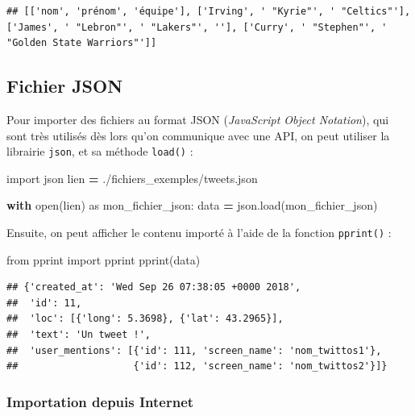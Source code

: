 \documentclass[
  12pt,
]{book}
\newenvironment{Shaded}{\begin{snugshade}}{\end{snugshade}}
\newcommand{\BuiltInTok}[1]{#1}
\newcommand{\ControlFlowTok}[1]{\textcolor[rgb]{0.13,0.29,0.53}{\textbf{#1}}}
\newcommand{\ImportTok}[1]{#1}
\newcommand{\NormalTok}[1]{#1}
\newcommand{\OperatorTok}[1]{\textcolor[rgb]{0.81,0.36,0.00}{\textbf{#1}}}
\newcommand{\StringTok}[1]{\textcolor[rgb]{0.31,0.60,0.02}{#1}}
\numberwithin{equation}{section}
\numberwithin{countremarque}{section}
\begin{document}
\begin{lstlisting}
## [['nom', 'prénom', 'équipe'], ['Irving', ' "Kyrie"', ' "Celtics"'], ['James', ' "Lebron"', ' "Lakers"', ''], ['Curry', ' "Stephen"', ' "Golden State Warriors"']]
\end{lstlisting}

\subsection{Fichier JSON}\label{fichier-json}

Pour importer des fichiers au format JSON (\emph{JavaScript Object Notation}), qui sont très utilisés dès lors qu'on communique avec une API, on peut utiliser la librairie \texttt{json}, et sa méthode \texttt{load()} :

\begin{Shaded}
\begin{Highlighting}[]
\ImportTok{import}\NormalTok{ json}
\NormalTok{lien }\OperatorTok{=} \StringTok{\textquotesingle{}./fichiers\_exemples/tweets.json\textquotesingle{}}

\ControlFlowTok{with} \BuiltInTok{open}\NormalTok{(lien) }\ImportTok{as}\NormalTok{ mon\_fichier\_json:}
\NormalTok{    data }\OperatorTok{=}\NormalTok{ json.load(mon\_fichier\_json)}
\end{Highlighting}
\end{Shaded}

Ensuite, on peut afficher le contenu importé à l'aide de la fonction \texttt{pprint()} :

\begin{Shaded}
\begin{Highlighting}[]
\ImportTok{from}\NormalTok{ pprint }\ImportTok{import}\NormalTok{ pprint}
\NormalTok{pprint(data)}
\end{Highlighting}
\end{Shaded}

\begin{lstlisting}
## {'created_at': 'Wed Sep 26 07:38:05 +0000 2018',
##  'id': 11,
##  'loc': [{'long': 5.3698}, {'lat': 43.2965}],
##  'text': 'Un tweet !',
##  'user_mentions': [{'id': 111, 'screen_name': 'nom_twittos1'},
##                    {'id': 112, 'screen_name': 'nom_twittos2'}]}
\end{lstlisting}

\subsubsection{Importation depuis Internet}\label{importation-depuis-internet-2}
\end{document}
